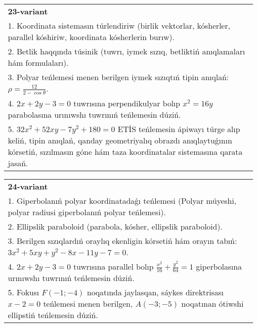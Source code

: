 \documentclass{article}
\begin{document}
\begin{tabular}{m{17cm}}
\textbf{23-variant}\\
1. Koordinata sistemasın túrlendiriw (birlik vektorlar, kósherler, parallel kóshiriw, koordinata kósherlerin burıw).\\

2. Betlik haqqında túsinik (tuwrı, iymek sızıq, betliktiń anıqlamaları hám formulaları).\\

3. Polyar teńlemesi menen berilgen iymek sızıqtıń tipin anıqlań: $\rho=\frac{12}{2-\cos\theta}$.\\

4. $2x + 2y - 3 = 0$ tuwrısına perpendikulyar bolıp $x^{2} = 16y$ parabolasına urınıwshı tuwrınıń teńlemesin dúziń.  \\

5. $32x^{2} + 52xy - 7y^{2} + 180 = 0$ ETİS teńlemesin ápiwayı túrge alıp keliń, tipin anıqlań, qanday geometriyalıq obrazdı anıqlaytuǵının kórsetiń, sızılmasın góne hám taza koordinatalar sistemasına qarata jasań.  
\end{tabular}
\vspace{1cm}


\begin{tabular}{m{17cm}}
\textbf{24-variant}\\
1. Giperbolanıń polyar koordinatadaǵı teńlemesi (Polyar múyeshi, polyar radiusi giperbolanıń polyar teńlemesi).\\

2. Ellipslik paraboloid (parabola, kósher, ellipslik paraboloid).\\

3. Berilgen sızıqlardıń oraylıq ekenligin kórsetiń hám orayın tabıń: $3 x^{2}+5 xy+y^{2}-8 x-11 y-7=0$.\\

4. $2x + 2y - 3 = 0$ tuwrısına parallel bolıp $\frac{x^{2}}{16} + \frac{y^{2}}{64} = 1$ giperbolasına urınıwshı tuwrınıń teńlemesin dúziń.  \\

5. Fokusı $F( - 1; - 4)$ noqatında jaylasqan, sáykes direktrisası $x - 2 = 0$ teńlemesi menen berilgen, $A( - 3; - 5)$ noqatınan ótiwshi ellipstiń teńlemesin dúziń.  
\end{tabular}
\vspace{1cm}
\end{document}
